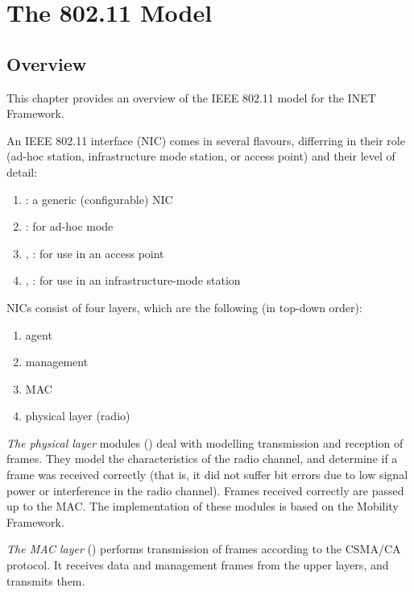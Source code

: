 \chapter{The 802.11 Model}
\label{cha:80211}


\section{Overview}

This chapter provides an overview of the IEEE 802.11 model for the INET Framework.

An IEEE 802.11 interface (NIC) comes in several flavours, differring
in their role (ad-hoc station, infrastructure mode station, or
access point) and their level of detail:

\begin{enumerate}
 \item {}: a generic (configurable) NIC
 \item {}: for ad-hoc mode
 \item {}, : for use in an access point
 \item {}, : for use in an
   infrastructure-mode station
\end{enumerate}

NICs consist of four layers, which are the following (in top-down order):

\begin{enumerate}
  \item agent
  \item management
  \item MAC
  \item physical layer (radio)
\end{enumerate}

\textit{The physical layer} modules () deal with modelling
transmission and reception of frames. They model the characteristics of
the radio channel, and determine if a frame was received correctly
(that is, it did not suffer bit errors due to low signal power or
interference in the radio channel). Frames received correctly are passed
up to the MAC. The implementation of these modules is based on the
Mobility Framework.

\textit{The MAC layer} () performs transmission of frames according
to the CSMA/CA protocol. It receives data and management frames from
the upper layers, and transmits them.

